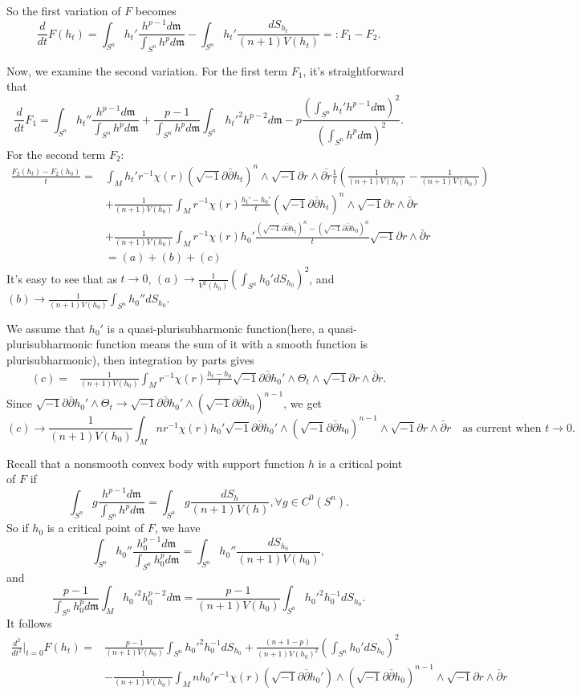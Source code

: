\documentclass[reqno]{amsart}
\theoremstyle{remark}
\theoremstyle{plain}
\newcommand{\ddc}{\sqrt{-1}\partial\bar\partial}
\begin{document}
So the first variation of $F$ becomes \[
\frac{d}{dt}F(h_t)=\int_{S^n}h_t'\frac{h^{p-1}d\mathfrak{m}}{\int_{S^n}h^pd\mathfrak{m}}-\int_{S^n}h_t'\frac{dS_{h_t}}{(n+1)V(h_t)}=:F_1-F_2.
\]

Now, we examine the second variation. For the first term $F_1$, it's straightforward that \[
\frac{d}{dt}F_1=\int_{S^n}h_t''\frac{h^{p-1}d\mathfrak{m}}{\int_{S^n}h^pd\mathfrak{m}}+\frac{p-1}{\int_{S^n}h^pd\mathfrak{m}}\int_{S^n}h_t'^2h^{p-2}d\mathfrak{m}-p\frac{(\int_{S^n}h_t'h^{p-1}d\mathfrak{m})^2}{(\int_{S^n}h^pd\mathfrak{m})^2}.
\]
For the second term $F_2$:\[
\begin{aligned}
    \frac{F_2(h_t)-F_2(h_0)}{t}=&\int_Mh_t'r^{-1}\chi(r)(\ddc h_t)^n\wedge\sqrt{-1}\partial{r}\wedge\bar{\partial{r}}\frac{1}{t}\left(\frac{1}{(n+1)V(h_t)}-\frac{1}{(n+1)V(h_0)}\right)\\
    &+\frac{1}{(n+1)V(h_0)}\int_Mr^{-1}\chi
    (r)\frac{h_t'-h_0'}{t}(\ddc h_t)^n\wedge\sqrt{-1}\partial r\wedge\bar{\partial}r\\
    &+\frac{1}{(n+1)V(h_0)}\int_Mr^{-1}\chi(r)h_0'\frac{(\ddc h_t)^n-(\ddc h_0)^n}{t}\sqrt{-1}\partial r\wedge\bar{\partial}r\\
    &=(a)+(b)+(c)
\end{aligned}
\]It's easy to see that as $t\rightarrow 0$, $(a)\rightarrow \frac{1}{V^2(h_0)}\left(\int_{S^n}h_0'dS_{h_0}\right)^2$, and $(b)\rightarrow \frac{1}{(n+1)V(h_0)}\int_{S^n}h_0''dS_{h_0}$. 

We assume that $h_0'$ is a quasi-plurisubharmonic function(here, a quasi-plurisubharmonic function means the sum of it with a smooth function is plurisubharmonic), then integration by parts gives \[
\begin{aligned}
    (c)=&\frac{1}{(n+1)V(h_0)}\int_Mr^{-1}\chi(r)\frac{h_t-h_0}{t}\ddc h_0'\wedge \Theta_t\wedge\sqrt{-1}\partial r\wedge\bar{\partial }r.
\end{aligned}
\] Since $\ddc h_0'\wedge \Theta_t\rightarrow \ddc h_0'\wedge(\ddc h_0)^{n-1}$, we get \[(c)\rightarrow\frac{1}{(n+1)V(h_0)} \int_Mnr^{-1}\chi(r)h_0'\ddc h_0'\wedge(\ddc h_0)^{n-1}\wedge\sqrt{-1}\partial r\wedge\bar{\partial}r \quad \text{as current when }t\rightarrow 0.\] 

Recall that a nonsmooth convex body with support function $h$ is a critical point of $F$ if \[\int_{S^n}g
\frac{h^{p-1}d\mathfrak{m}}{\int_{S^n}h^pd\mathfrak{m}}=\int_{S^n}g\frac{dS_{h}}{(n+1)V(h)},\forall g\in C^0(S^n).
\]
So if $h_0$ is a critical point of $F$, we have \[
\int_{S^n}h_0''\frac{h_0^{p-1}d\mathfrak{m}}{\int_{S^n}h_0^pd\mathfrak{m}}=\int
_{S^n}h_0''\frac{dS_{h_0}}{(n+1)V(h_0)},
\]
and \[\frac{p-1}{\int_{S^n}h_0^pd\mathfrak{m}}
\int_Mh_0'^2h_0^{p-2}d\mathfrak{m}=\frac{p-1}{(n+1)V(h_0)}\int_{S^n}h_0'^2h_0^{-1}dS_{h_0}.
\]
It follows \[
\begin{aligned}
 \frac{d^2}{dt^2}|_{t=0}F(h_t)=& \frac{p-1}{(n+1)V(h_0)}\int_{S^n}h_0'^2h_0^{-1}dS_{h_0} +\frac{(n+1-p)}{(n+1)V(h_0)^2}\left(\int_{S^n}h_0'dS_{h_0}\right)^2\\
 &-\frac{1}{(n+1)V(h_0)}\int_Mnh_0'r^{-1}\chi(r)(\ddc h_0')\wedge(\ddc h_0)^{n-1}\wedge\sqrt{-1}\partial r\wedge\bar{\partial} r
\end{aligned}
\]
\end{document}
